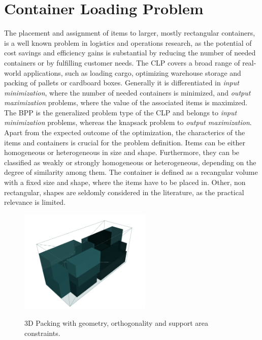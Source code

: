 \section{Container Loading Problem}
\label{sec:clp_definition}

The placement and assignment of items to larger, mostly rectangular
containers, is a well known problem in logistics and operations research, as the
potential of cost savings and efficiency gains is substantial by reducing the number
of needed containers or by fulfilling customer needs. The \gls{CLP} covers a broad range of real-world applications,
such as loading cargo, optimizing warehouse storage and packing of pallets or cardboard boxes.
Generally it is differentiated in \textit{input minimization},
where the number of needed containers is minimized, and \textit{output maximization} problems,
where the value of the associated items is maximized. The \gls{BPP} is the generalized problem type of the \gls{CLP}
and belongs to \textit{input minimization} problems, whereas the knapsack problem to \textit{output maximization}. Apart from the expected outcome of the optimization,
the characterics of the items and containers is crucial for the problem definition. Items can be either
homogeneous or heterogeneous in size and shape. Furthermore, they can be classified as weakly or strongly
homogeneous or heterogeneous, depending on the degree of similarity among them. The container is
defined as a recangular volume with a fixed size and shape, where the items have to be placed in.
Other, non rectangular, shapes are seldomly considered in the literature, as the practical relevance is
limited.
\begin{figure}
    \begin{center}
        \centering
        \vspace{-25pt}
        \includegraphics[width=6.3cm]{pictures/3l_cvrp_example.png}
        \caption[Visualized 3D packing with packing constraints.]{3D Packing with geometry, orthogonality and support area constraints.\footnotemark}
        \vspace{-25pt}
        \label{fig:solution-visualization}
    \end{center}
\end{figure}
